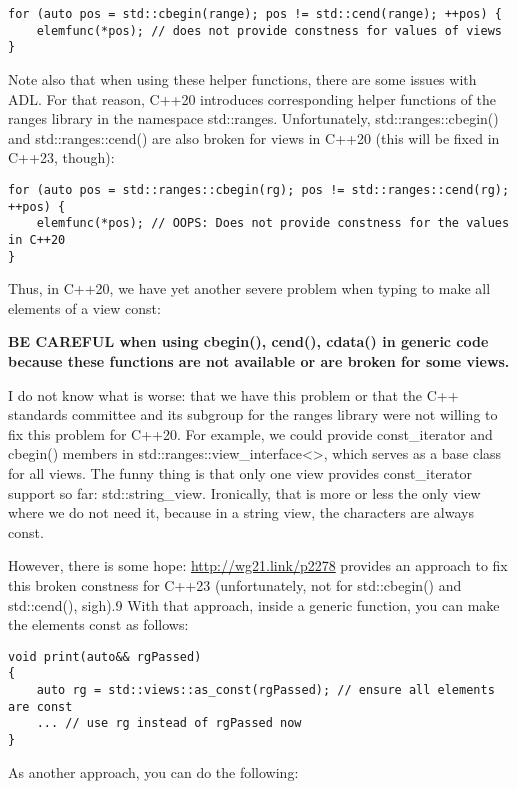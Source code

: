 \begin{lstlisting}[style=styleCXX]
for (auto pos = std::cbegin(range); pos != std::cend(range); ++pos) {
	elemfunc(*pos); // does not provide constness for values of views
}
\end{lstlisting}

Note also that when using these helper functions, there are some issues with ADL. For that reason, C++20 introduces corresponding helper functions of the ranges library in the namespace std::ranges. Unfortunately, std::ranges::cbegin() and std::ranges::cend() are also broken for views in C++20 (this will be fixed in C++23, though):

\begin{lstlisting}[style=styleCXX]
for (auto pos = std::ranges::cbegin(rg); pos != std::ranges::cend(rg); ++pos) {
	elemfunc(*pos); // OOPS: Does not provide constness for the values in C++20
}
\end{lstlisting}

Thus, in C++20, we have yet another severe problem when typing to make all elements of a view const:

\textbf{BE CAREFUL when using cbegin(), cend(), cdata() in generic code because these functions are not available or are broken for some views.}

I do not know what is worse: that we have this problem or that the C++ standards committee and its subgroup for the ranges library were not willing to fix this problem for C++20. For example, we could provide const\_iterator and cbegin() members in std::ranges::view\_interface<>, which serves as a base class for all views. The funny thing is that only one view provides const\_iterator support so far: std::string\_view. Ironically, that is more or less the only view where we do not need it, because in a string view, the characters are always const.

However, there is some hope: \url{http://wg21.link/p2278} provides an approach to fix this broken constness for C++23 (unfortunately, not for std::cbegin() and std::cend(), sigh).9 With that approach, inside a generic function, you can make the elements const as follows:

\begin{lstlisting}[style=styleCXX]
void print(auto&& rgPassed)
{
	auto rg = std::views::as_const(rgPassed); // ensure all elements are const
	... // use rg instead of rgPassed now
}
\end{lstlisting}

As another approach, you can do the following:

